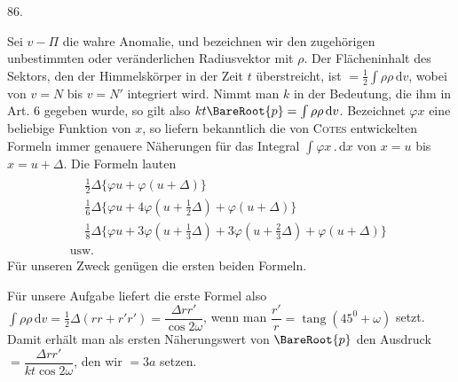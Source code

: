 \par{}\medskip
\hypertarget{native-115-article086}{}
\begin{center}86.\end{center}
Sei $v-\Pi$ die wahre Anomalie, und bezeichnen wir den zugehörigen unbestimmten oder veränderlichen Radiusvektor mit $\rho$. Der Flächeninhalt des Sektors, den der Himmelskörper in der Zeit $t$ überstreicht, ist $=\tfrac12\int\rho\rho\,\mathrm{d}v$, wobei von $v=N$ bis $v=N'$ integriert wird. Nimmt man $k$ in der Bedeutung, die ihm in Art. 6 gegeben wurde, so gilt also $kt\BareRoot{p}=\int\rho\rho\,\mathrm{d}v$. Bezeichnet $\varphi x$ eine beliebige Funktion von $x$, so liefern bekanntlich die von \textsc{Cotes} entwickelten Formeln immer genauere Näherungen für das Integral $\int\varphi x\mathbin{.}\mathrm{d}x$ von $x=u$ bis $x=u+\Delta$. Die Formeln lauten
\[
\begin{gathered}
\begin{aligned}
&\tfrac12\Delta\{\varphi u+\varphi(u+\Delta)\}\\[4pt]
&\tfrac16\Delta\{\varphi u+4\varphi(u+\tfrac12\Delta)+\varphi(u+\Delta)\}\\[4pt]
&\tfrac18\Delta\{\varphi u+3\varphi(u+\tfrac13\Delta)+3\varphi(u+\tfrac23\Delta)+\varphi(u+\Delta)\}
\end{aligned}\\[4pt]
\text{usw.}
\end{gathered}
\]
\noindent Für unseren Zweck genügen die ersten beiden Formeln.

Für unsere Aufgabe liefert die erste Formel also $\int\rho\rho\,\mathrm{d}v=\tfrac12\Delta(rr+r'r')=\dfrac{\Delta rr'}{\cos2\omega}$, wenn man $\dfrac{r'}r=\operatorname{tang}(45^0+\omega)$ setzt. Damit erhält man als ersten Näherungswert von $\BareRoot{p}$ den Ausdruck $=\dfrac{\Delta rr'}{kt\cos2\omega}$, den wir $=3a$ setzen.


